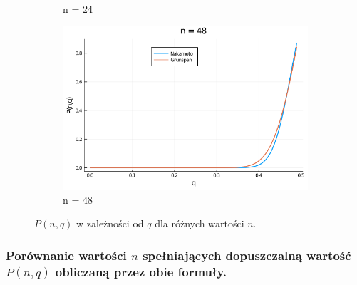 \documentclass{article}
\begin{document}
\begin{figure}[H]
\begin{subfigure}{0.6\textwidth}
                \caption{n = 24}
            \end{subfigure}
            \begin{subfigure}{0.6\textwidth}
                \centering
                \includegraphics[width=\linewidth]{img/n=48.png}
                \caption{n = 48}
            \end{subfigure}
            \caption{$P(n,q)$ w zależności od $q$ dla różnych wartości $n$.}
        \end{figure}
    

    \subsubsection{Porównanie wartości $n$ spełniających dopuszczalną wartość $P(n,q)$ obliczaną przez obie formuły.}
\end{document}
